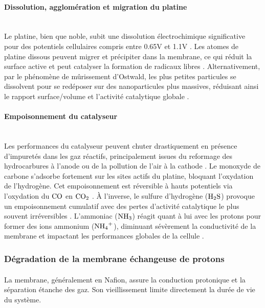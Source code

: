 \paragraph{Dissolution, agglomération et migration du platine}\mbox{}\\
Le platine, bien que noble, subit une dissolution électrochimique significative pour des potentiels cellulaires compris entre 0.65V et 1.1V \cite{wang_pem_2011}\cite{cherevko_durability_2016}. Les atomes de platine dissous peuvent migrer et précipiter dans la membrane, ce qui réduit la surface active et peut catalyser la formation de radicaux libres \cite{wong_mitigation_2015}. Alternativement, par le phénomène de mûrissement d'Ostwald, les plus petites particules se dissolvent pour se redéposer sur des nanoparticules plus massives, réduisant ainsi le rapport surface/volume et l'activité catalytique globale \cite{meier_design_2014}.

\paragraph{Empoisonnement du catalyseur}\mbox{}\\
Les performances du catalyseur peuvent chuter drastiquement en présence d'impuretés dans les gaz réactifs, principalement issues du reformage des hydrocarbures à l'anode ou de la pollution de l'air à la cathode \cite{zamel_effect_2011}. Le monoxyde de carbone s'adsorbe fortement sur les sites actifs du platine, bloquant l'oxydation de l'hydrogène. Cet empoisonnement est réversible à hauts potentiels via l'oxydation du $\ce{CO}$ en $\ce{CO2}$ \cite{valdes-lopez_carbon_2020}. À l'inverse, le sulfure d'hydrogène ($\ce{H2S}$) provoque un empoisonnement cumulatif avec des pertes d'activité catalytique le plus souvent irréversibles \cite{sethuraman_analysis_2010}. L'ammoniac ($\ce{NH3}$) réagit quant à lui avec les protons pour former des ions ammonium ($\ce{NH4^+}$), diminuant sévèrement la conductivité de la membrane et impactant les performances globales de la cellule \cite{zhao_reviews_2020}.

\subsubsection{Dégradation de la membrane échangeuse de protons}

La membrane, généralement en Nafion\textsuperscript{\textregistered}, assure la conduction protonique et la séparation étanche des gaz. Son vieillissement limite directement la durée de vie du système.

